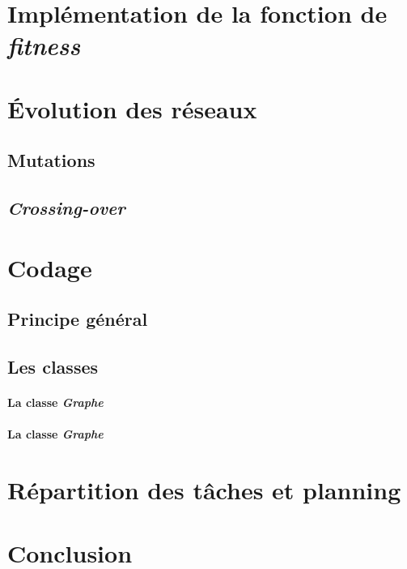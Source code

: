 \section{Implémentation de la fonction de \textit{fitness}}


\section{\'Evolution des réseaux}

\subsection{Mutations}

\subsection{\textit{Crossing-over}}


\section{Codage}

\subsection{Principe général}

\subsection{Les classes}
\paragraph*{La classe \textit{Graphe}\\}

\paragraph*{La classe \textit{Graphe}\\}


\section{Répartition des tâches et planning}


\section{Conclusion}

